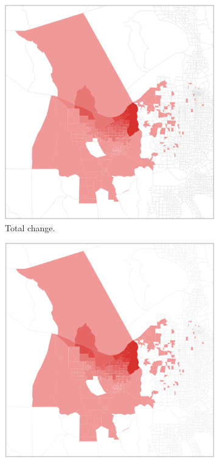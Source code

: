 \begin{landscape}
\begin{figure}
     \centering
     \begin{subfigure}[b]{0.45\textwidth}
         \centering
         \includegraphics[width=\textwidth]{figures/chapter4/totalchangechoropleth.png}
         \caption{Total change.}
         \label{fig:totchangemap}
     \end{subfigure}
     \hfill
     \begin{subfigure}[b]{0.45\textwidth}
         \centering
         \includegraphics[width=\textwidth]{figures/chapter4/percentchangechoropleth.png}

\end{subfigure}
\end{figure}
\end{landscape}
